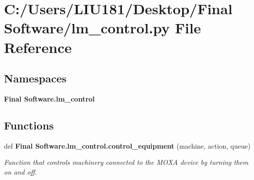 \section{C\+:/\+Users/\+L\+I\+U181/\+Desktop/\+Final Software/lm\+\_\+control.py File Reference}
\label{lm__control_8py}
\subsection*{Namespaces}
\begin{DoxyCompactItemize}
\item 
 \textbf{ Final Software.\+lm\+\_\+control}
\end{DoxyCompactItemize}
\subsection*{Functions}
\begin{DoxyCompactItemize}
\item 
def \textbf{ Final Software.\+lm\+\_\+control.\+control\+\_\+equipment} (machine, action, queue)
\begin{DoxyCompactList}\small\item\em Function that controls machinery connected to the M\+O\+XA device by turning them on and off. \end{DoxyCompactList}\end{DoxyCompactItemize}
